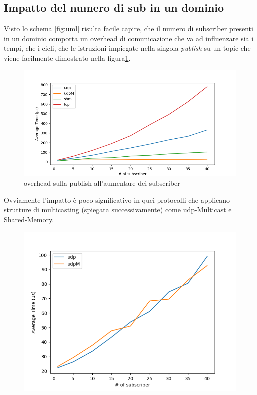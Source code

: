 \subsection{Impatto del numero di sub in un dominio}
Visto lo schema \ref{fig:uml} risulta facile capire, che il numero di subscriber presenti in un dominio comporta un overhead di comunicazione che va ad influenzare sia i tempi, che i cicli, che le istruzioni impiegate nella singola \emph{publish} su un topic che viene facilmente dimostrato nella figura\ref{fig:test3_overhead}.
\begin{figure}[H]
    \centering
    \includegraphics[width=\textwidth]{./results/test3_sending_multiplesub.png} %
    \caption{overhead sulla publish all'aumentare dei subscriber}
    \label{fig:test3_overhead}
\end{figure}
Ovviamente l'impatto è poco significativo in quei protocolli che applicano strutture di multicasting (spiegata successivamente) %
come udp-Multicast e Shared-Memory. 

\begin{figure}[H]
    \includegraphics[width=\textwidth]{./results/test3_udpvsudpM.png} %
        \caption{}
        \label{}
\end{figure}

